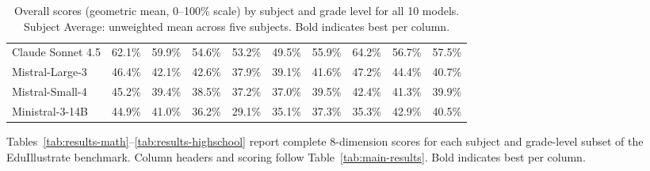 \documentclass[11pt]{article}
\begin{document}
\begin{table}[t]
\begin{tabular}{lcccccc|ccc}
Claude Sonnet 4.5      & 62.1\% & 59.9\% & 54.6\% & 53.2\% & 49.5\% & 55.9\% & 64.2\% & 56.7\% & 57.5\% \\
Mistral-Large-3        & 46.4\% & 42.1\% & 42.6\% & 37.9\% & 39.1\% & 41.6\% & 47.2\% & 44.4\% & 40.7\% \\
Mistral-Small-4        & 45.2\% & 39.4\% & 38.5\% & 37.2\% & 37.0\% & 39.5\% & 42.4\% & 41.3\% & 39.9\% \\
Ministral-3-14B        & 44.9\% & 41.0\% & 36.2\% & 29.1\% & 35.1\% & 37.3\% & 35.3\% & 42.9\% & 40.5\% \\
\bottomrule
\end{tabular}
\caption{Overall scores (geometric mean, 0--100\% scale) by subject and grade level for all 10 models. Subject Average: unweighted mean across five subjects. Bold indicates best per column.}
\label{tab:subject-grade}
\end{table}

Tables~\ref{tab:results-math}--\ref{tab:results-highschool} report complete 8-dimension scores for each subject and grade-level subset of the EduIllustrate benchmark. Column headers and scoring follow Table~\ref{tab:main-results}. Bold indicates best per column.
\end{document}

